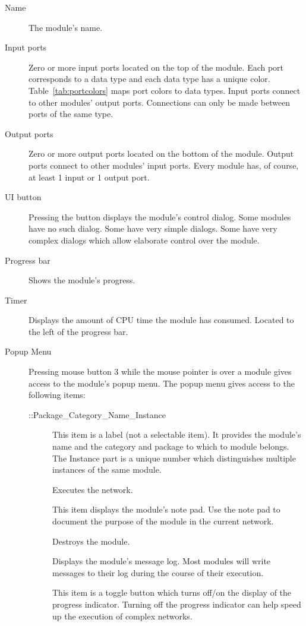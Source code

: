 \begin{description}
\item[Name] The module's name.
\item[Input ports] Zero or more input ports located on the top of the
  module.  Each port corresponds to a data type and each data type has a
  unique color.  Table~\ref{tab:portcolors} maps port colors to data types.
  Input ports connect to other modules' output ports.  Connections can only
  be made between ports of the same type.
\item[Output ports] Zero or more output ports located on the bottom of the
  module.  Output ports connect to other modules' input ports.  Every
  module has, of course, at least 1 input or 1 output port.
\item[UI button] Pressing the  button displays the module's
  control dialog. Some modules have no such dialog. Some have very
  simple dialogs.  Some have very complex dialogs which allow elaborate
  control over the module.  
\item[Progress bar] Shows the module's progress.
\item[Timer] Displays the amount of CPU time the module has consumed.
  Located to the left of the progress bar.
\item[Popup Menu] Pressing mouse button 3 while the mouse
  pointer is over a module gives access to the module's popup menu.  The
  popup menu gives access to the following items:
  \begin{description}
  \item[::Package\_Category\_Name\_Instance] This item is a label (not a
    selectable item).  It provides the module's name and the category and
    package to which to module belongs.  The Instance part is a unique
    number which distinguishes multiple instances of the same module.
  \item[] Executes the network.
  \item[] This item displays the module's note pad.  Use the note pad
    to document the purpose of the module in the current network.
  \item[] Destroys the module.
  \item[] Displays the module's message log.  Most modules will
    write messages to their log during the course of their execution.
  \item[] This item is a toggle button which turns off/on the
    display of the progress indicator.  Turning off the progress indicator
    can help speed up the execution of complex networks.
  \end{description}
\end{description}

